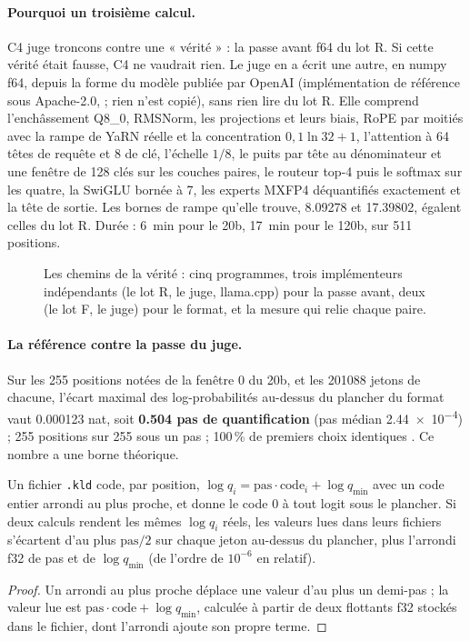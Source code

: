 \paragraph{Pourquoi un troisième calcul.} C4 juge troncons contre une « vérité » : la passe avant f64 du lot R. Si cette vérité était fausse, C4 ne vaudrait rien. Le juge en a écrit une autre, en numpy f64, depuis la forme du modèle publiée par OpenAI (implémentation de référence sous Apache-2.0, \cite{openai2025gptossref} ; rien n'est copié), sans rien lire du lot R. Elle comprend l'enchâssement Q8\_0, RMSNorm, les projections et leurs biais, RoPE par moitiés avec la rampe de YaRN réelle et la concentration $0{,}1 \ln 32 + 1$, l'attention à 64 têtes de requête et 8 de clé, l'échelle $1/8$, le puits par tête au dénominateur et une fenêtre de 128 clés sur les couches paires, le routeur top-4 puis le softmax sur les quatre, la SwiGLU bornée à 7, les experts MXFP4 déquantifiés exactement et la tête de sortie. Les bornes de rampe qu'elle trouve, \num{8.09278} et \num{17.39802}, égalent celles du lot R. Durée : \SI{6}{\minute} pour le 20b, \SI{17}{\minute} pour le 120b, sur 511 positions.

\begin{figure}[ht]
\centering
\SchemaResChemins
\caption[Les chemins de la vérité]{Les chemins de la vérité : cinq programmes, trois implémenteurs indépendants (le lot R, le juge, llama.cpp) pour la passe avant, deux (le lot F, le juge) pour le format, et la mesure qui relie chaque paire.}
\label{t2e-fig:chemins}
\end{figure}

\paragraph{La référence contre la passe du juge.} Sur les 255 positions notées de la fenêtre 0 du 20b, et les \num{201088} jetons de chacune, l'écart maximal des log-probabilités au-dessus du plancher du format vaut \num{0.000123} nat, soit \textbf{\num{0.504} pas de quantification} (pas médian \num{2.44e-4}) ; 255 positions sur 255 sous un pas ; \num{100}\,\% de premiers choix identiques \mes. Ce nombre a une borne théorique.

\begin{proposition}\label{t2e-prop:format}
Un fichier \texttt{.kld} code, par position, $\log q_i = \text{pas} \cdot \text{code}_i + \log q_{\min}$ avec un code entier arrondi au plus proche, et donne le code 0 à tout logit sous le plancher. Si deux calculs rendent les mêmes $\log q_i$ réels, les valeurs lues dans leurs fichiers s'écartent d'au plus $\text{pas}/2$ sur chaque jeton au-dessus du plancher, plus l'arrondi f32 de pas et de $\log q_{\min}$ (de l'ordre de $10^{-6}$ en relatif).
\end{proposition}
\begin{proof}
Un arrondi au plus proche déplace une valeur d'au plus un demi-pas ; la valeur lue est $\text{pas} \cdot \text{code} + \log q_{\min}$, calculée à partir de deux flottants f32 stockés dans le fichier, dont l'arrondi ajoute son propre terme.
\end{proof}

